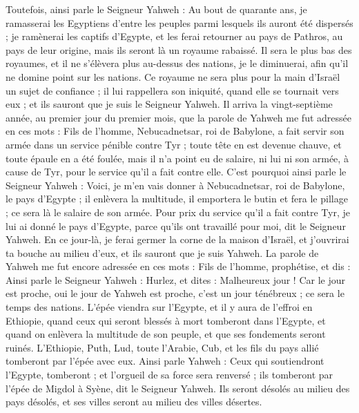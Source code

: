 \begin{multicols}{2}
Toutefois, ainsi parle le Seigneur Yahweh : Au bout de quarante ans, je ramasserai les Egyptiens d'entre les peuples parmi lesquels ils auront été dispersés ;
je ramènerai les captifs d'Egypte, et les ferai retourner au pays de Pathros, au pays de leur origine, mais ils seront là un royaume rabaissé.
Il sera le plus bas des royaumes, et il ne s'élèvera plus au-dessus des nations, je le diminuerai, afin qu'il ne domine point sur les nations.
Ce royaume ne sera plus pour la main d’Israël un sujet de confiance ; il lui rappellera son iniquité, quand elle se tournait vers eux ; et ils sauront que je suis le Seigneur Yahweh.
Il arriva la vingt-septième année, au premier jour du premier mois, que la parole de Yahweh me fut adressée en ces mots :
Fils de l’homme, Nebucadnetsar, roi de Babylone, a fait servir son armée dans un service pénible contre Tyr ; toute tête en est devenue chauve, et toute épaule en a été foulée, mais il n'a point eu de salaire, ni lui ni son armée, à cause de Tyr, pour le service qu'il a fait contre elle.
C'est pourquoi ainsi parle le Seigneur Yahweh : Voici, je m'en vais donner à Nebucadnetsar, roi de Babylone, le pays d'Egypte ; il enlèvera la multitude, il emportera le butin et fera le pillage ; ce sera là le salaire de son armée.
Pour prix du service qu’il a fait contre Tyr, je lui ai donné le pays d'Egypte, parce qu'ils ont travaillé pour moi, dit le Seigneur Yahweh.
En ce jour-là, je ferai germer la corne de la maison d'Israël, et j'ouvrirai ta bouche au milieu d'eux, et ils sauront que je suis Yahweh.
\VerseOne{}La parole de Yahweh me fut encore adressée en ces mots :
Fils de l’homme, prophétise, et dis : Ainsi parle le Seigneur Yahweh : Hurlez, et dites : Malheureux jour !
Car le jour est proche, oui le jour de Yahweh est proche, c'est un jour ténébreux ; ce sera le temps des nations.
L'épée viendra sur l'Egypte, et il y aura de l'effroi en Ethiopie, quand ceux qui seront blessés à mort tomberont dans l'Egypte, et quand on enlèvera la multitude de son peuple, et que ses fondements seront ruinés.
L’Ethiopie, Puth, Lud, toute l’Arabie, Cub, et les fils du pays allié tomberont par l'épée avec eux.
Ainsi parle Yahweh : Ceux qui soutiendront l'Egypte, tomberont ; et l'orgueil de sa force sera renversé ; ils tomberont par l'épée de Migdol à Syène, dit le Seigneur Yahweh.
Ils seront désolés au milieu des pays désolés, et ses villes seront au milieu des villes désertes.

\end{multicols}
